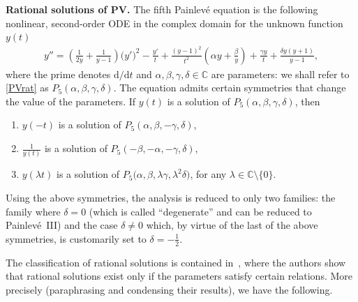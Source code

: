 \documentclass[10pt,a4paper]{amsart}
\numberwithin{equation}{section}
\theoremstyle{definition}
\def\le{\left}
\def\ri{\right}
\def \d{{\mathrm d}}
\def\C{{\mathbb C}}
\begin{document}
{\bf Rational solutions of PV.}
The fifth Painlev\'e equation is the following nonlinear, second-order ODE in the complex domain for the unknown function $y(t)$
\begin{gather}
y'' = \le(\frac 1{2y} + \frac 1{y-1}\ri) \bigl(y'\bigr)^2 - \frac {y'}t + \frac {(y-1)^2}{t^2} \le(\alpha y + \frac \beta y\ri) + \frac {\gamma y}t + \frac {\delta y (y+1)}{y-1},
\label{PVrat}
\end{gather}
where the prime denotes $\d/{\d t}$ and $\alpha, \beta, \gamma, \delta \in \C$ are parameters: we shall refer to \eqref{PVrat} as $P_5(\alpha, \beta, \gamma,\delta)$.
The equation admits certain symmetries that change the value of the parameters. If $y(t)$ is a solution of $P_5(\alpha,\beta,\gamma,\delta)$, then
\begin{enumerate}\itemsep=0pt
\item[(1)] $y(-t)$ is a solution of $P_5(\alpha, \beta, - \gamma, \delta)$,
\item[(2)] $\frac 1{y(t)}$ is a solution of $P_5(-\beta,-\alpha, -\gamma, \delta)$,
\item[(3)] $y(\lambda t)$ is a solution of $P_5\bigl(\alpha, \beta, \lambda\gamma, \lambda^2 \delta\bigr)$, for any $\lambda\in \C\setminus\{0\}$.
\end{enumerate}
Using the above symmetries, the analysis is reduced to only two families: the family where $\delta=0$ (which is called ``degenerate'' and can be reduced to Painlev\'e~III) and the case $\delta\neq 0$ which, by virtue of the last of the above symmetries, is customarily set to $\delta = -\frac 1 2$.

The classification of rational solutions is contained in~\cite{Kitaev94}, where the authors show that rational solutions exist only if the parameters satisfy certain relations. More precisely (paraphrasing and condensing their results), we have the following.
\end{document}
